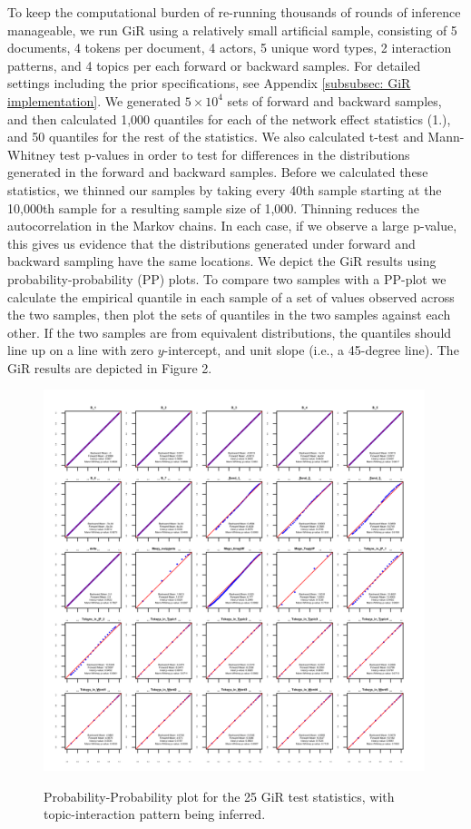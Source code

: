 \documentclass[a4paper]{article}
\begin{document}
To keep the computational burden of re-running thousands of rounds of inference manageable, we run GiR using a relatively small artificial sample, consisting of 5 documents, 4 tokens per document, 4 actors, 5 unique word types, 2 interaction patterns, and 4 topics per each forward or backward samples. For detailed settings including the prior specifications, see Appendix \ref{subsubsec: GiR implementation}. 
We generated $5\times 10^4$ sets of forward and backward samples, and then calculated 1,000 quantiles for each of the network effect statistics (1.), and 50 quantiles for the rest of the statistics. We also calculated t-test and Mann-Whitney test p-values in order to test for differences in the distributions generated in the forward and backward samples. Before we calculated these statistics, we thinned our samples 
by taking every 40th sample starting at the 10,000th sample for a resulting sample size of 1,000. Thinning reduces the autocorrelation in the Markov chains. In each case, if we observe a large p-value, this gives us evidence that the distributions generated under forward and backward sampling have the same locations. We depict the GiR results using probability-probability (PP) plots. To compare two samples with a PP-plot we calculate the empirical quantile in each sample of a set of values observed across the two samples, then plot the sets of quantiles in the two samples against each other. If the two samples are from equivalent distributions, the quantiles should line up on a line with zero $y$-intercept, and unit slope (i.e., a 45-degree line). The GiR results are depicted in Figure 2. 
\begin{figure}[ht]
	\centering
	\includegraphics[width=0.99\textwidth]{plots/Schein_C_50K-1.png} 
	\label{fig:PPplot_C}
	\caption{Probability-Probability plot for the 25 GiR test statistics, with topic-interaction pattern being inferred.}
\end{figure}
\end{document}
